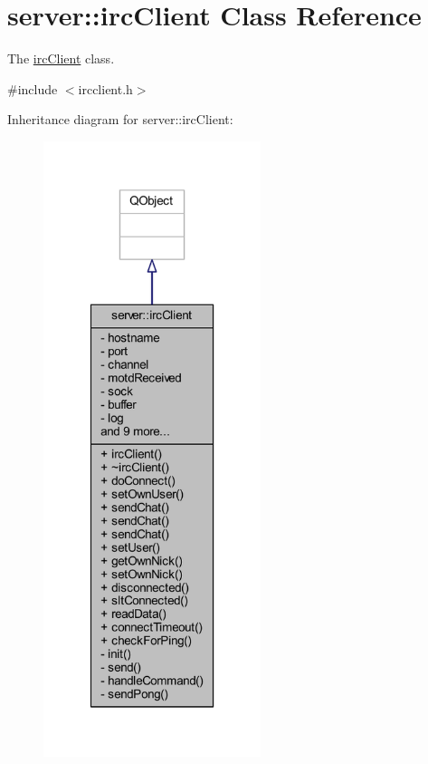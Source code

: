 \hypertarget{classserver_1_1irc_client}{\section{server\-:\-:irc\-Client Class Reference}
\label{d1/d10/classserver_1_1irc_client}
}


The \hyperlink{classserver_1_1irc_client}{irc\-Client} class.  




{\ttfamily \#include $<$ircclient.\-h$>$}



Inheritance diagram for server\-:\-:irc\-Client\-:\nopagebreak
\begin{figure}[H]
\begin{center}
\leavevmode
\includegraphics[width=180pt]{d4/dfd/classserver_1_1irc_client__inherit__graph}
\end{center}
\end{figure}



